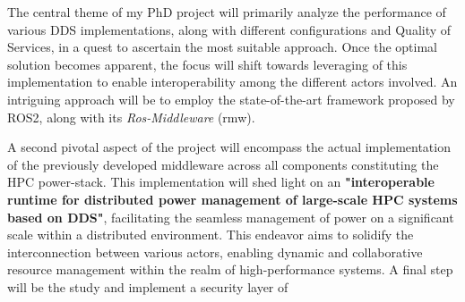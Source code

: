 
The central theme of my PhD project will primarily analyze the performance of various DDS implementations, along with different configurations and Quality of Services, in a quest to ascertain the most suitable approach. Once the optimal solution becomes apparent, the focus will shift towards leveraging of this implementation to enable interoperability among the different actors involved. An intriguing approach will be to employ the state-of-the-art framework proposed by ROS2, along with its \emph{Ros-Middleware} (rmw).

A second pivotal aspect of the project will encompass the actual implementation of the previously developed middleware across all components constituting the HPC power-stack. This implementation will shed light on an \textbf{"interoperable runtime for distributed power management of large-scale HPC systems based on DDS"}, facilitating the seamless management of power on a significant scale within a distributed environment. This endeavor aims to solidify the interconnection between various actors, enabling dynamic and collaborative resource management within the realm of high-performance systems.
A final step will be the study and implement a security layer of 

